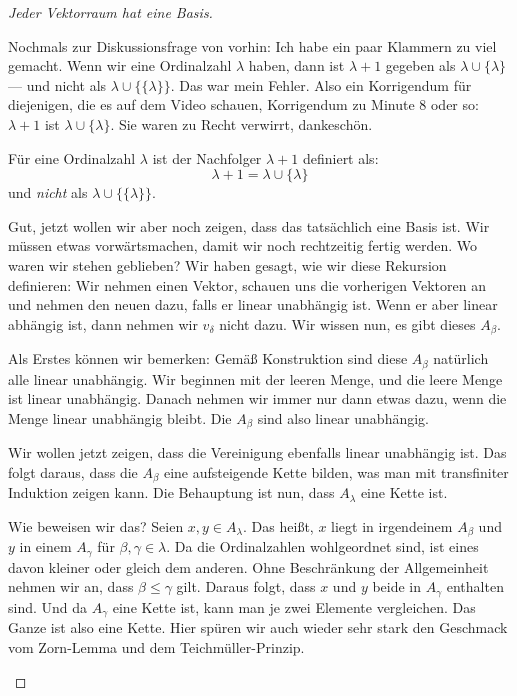 \begin{proof}[Jeder Vektorraum hat eine Basis]
\begin{spoken-clean}[00:47:00 - 00:49:10]
Nochmals zur Diskussionsfrage von vorhin: Ich habe ein paar Klammern zu viel gemacht. Wenn wir eine Ordinalzahl $\lambda$ haben, dann ist $\lambda + 1$ gegeben als $\lambda \cup \{\lambda\}$ --- und nicht als $\lambda \cup \{\{\lambda\}\}$. Das war mein Fehler. Also ein Korrigendum für diejenigen, die es auf dem Video schauen, Korrigendum zu Minute $8$ oder so: $\lambda + 1$ ist $\lambda \cup \{\lambda\}$. Sie waren zu Recht verwirrt, dankeschön.
\end{spoken-clean}

\begin{math-stroke}
\begin{remark}
Für eine Ordinalzahl $\lambda$ ist der Nachfolger $\lambda + 1$ definiert als:
\[
\lambda + 1 = \lambda \cup \{\lambda\}
\]
und \emph{nicht} als $\lambda \cup \{\{\lambda\}\}$.
\end{remark}
\end{math-stroke}

\begin{spoken-clean}[00:49:10 - 00:52:08]
Gut, jetzt wollen wir aber noch zeigen, dass das tatsächlich eine Basis ist. Wir müssen etwas vorwärtsmachen, damit wir noch rechtzeitig fertig werden. Wo waren wir stehen geblieben? Wir haben gesagt, wie wir diese Rekursion definieren: Wir nehmen einen Vektor, schauen uns die vorherigen Vektoren an und nehmen den neuen dazu, falls er linear unabhängig ist. Wenn er aber linear abhängig ist, dann nehmen wir $v_\delta$ nicht dazu. Wir wissen nun, es gibt dieses $A_\beta$.

Als Erstes können wir bemerken: Gemäß Konstruktion sind diese $A_\beta$ natürlich alle linear unabhängig. Wir beginnen mit der leeren Menge, und die leere Menge ist linear unabhängig. Danach nehmen wir immer nur dann etwas dazu, wenn die Menge linear unabhängig bleibt. Die $A_\beta$ sind also linear unabhängig.

Wir wollen jetzt zeigen, dass die Vereinigung ebenfalls linear unabhängig ist. Das folgt daraus, dass die $A_\beta$ eine aufsteigende Kette bilden, was man mit transfiniter Induktion zeigen kann. Die Behauptung ist nun, dass $A_\lambda$ eine Kette ist.

Wie beweisen wir das? Seien $x, y \in A_\lambda$. Das heißt, $x$ liegt in irgendeinem $A_\beta$ und $y$ in einem $A_\gamma$ für $\beta, \gamma \in \lambda$. Da die Ordinalzahlen wohlgeordnet sind, ist eines davon kleiner oder gleich dem anderen. Ohne Beschränkung der Allgemeinheit nehmen wir an, dass $\beta \le \gamma$ gilt. Daraus folgt, dass $x$ und $y$ beide in $A_\gamma$ enthalten sind. Und da $A_\gamma$ eine Kette ist, kann man je zwei Elemente vergleichen. Das Ganze ist also eine Kette. Hier spüren wir auch wieder sehr stark den Geschmack vom Zorn-Lemma und dem Teichmüller-Prinzip.
\end{spoken-clean}


\end{proof}
